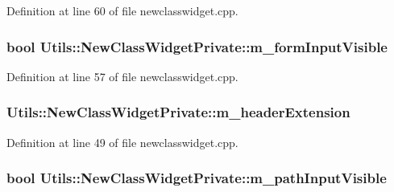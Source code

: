 \-Definition at line 60 of file newclasswidget.\-cpp.

\hypertarget{struct_utils_1_1_new_class_widget_private_a485151d4b70e4b735b1cd8b395f47163}{
\subsubsection[{m\-\_\-form\-Input\-Visible}]{\setlength{\rightskip}{0pt plus 5cm}bool {\bf \-Utils\-::\-New\-Class\-Widget\-Private\-::m\-\_\-form\-Input\-Visible}}}\label{struct_utils_1_1_new_class_widget_private_a485151d4b70e4b735b1cd8b395f47163}


\-Definition at line 57 of file newclasswidget.\-cpp.

\hypertarget{struct_utils_1_1_new_class_widget_private_aa2c6dc307213250a01848e1b0948e9ce}{
\subsubsection[{m\-\_\-header\-Extension}]{ {\bf \-Utils\-::\-New\-Class\-Widget\-Private\-::m\-\_\-header\-Extension}}}\label{struct_utils_1_1_new_class_widget_private_aa2c6dc307213250a01848e1b0948e9ce}


\-Definition at line 49 of file newclasswidget.\-cpp.

\hypertarget{struct_utils_1_1_new_class_widget_private_a413581a7a468f2da3849013b63932487}{
\subsubsection[{m\-\_\-path\-Input\-Visible}]{\setlength{\rightskip}{0pt plus 5cm}bool {\bf \-Utils\-::\-New\-Class\-Widget\-Private\-::m\-\_\-path\-Input\-Visible}}}\label{struct_utils_1_1_new_class_widget_private_a413581a7a468f2da3849013b63932487}


